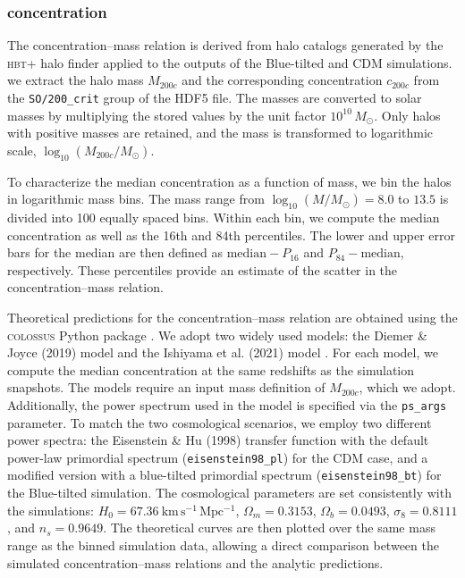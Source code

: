 \documentclass[
 reprint,
 superscriptaddress,
 nofootinbib,
 nobibnotes,
 amsmath,
 amssymb,
 aps,
 prd,
 floatfix,
 longbibliography
]{revtex4-1}
\begin{document}
\subsubsection{concentration\label{subsub:concentration}}
{\color{blue}The concentration–mass relation is derived from halo catalogs generated by the \textsc{hbt+} halo finder applied to the outputs of the Blue-tilted and CDM simulations. we extract the halo mass \(M_{200c}\) and the corresponding concentration \(c_{200c}\) from the \texttt{SO/200\_crit} group of the HDF5 file. The masses are converted to solar masses by multiplying the stored values by the unit factor \(10^{10}\,M_{\odot}\). Only halos with positive masses are retained, and the mass is transformed to logarithmic scale, \(\log_{10}(M_{200c}/M_{\odot})\).

To characterize the median concentration as a function of mass, we bin the halos in logarithmic mass bins. The mass range from \(\log_{10}(M/M_{\odot}) = 8.0\) to \(13.5\) is divided into 100 equally spaced bins. Within each bin, we compute the median concentration as well as the 16th and 84th percentiles. The lower and upper error bars for the median are then defined as \(\mathrm{median} - P_{16}\) and \(P_{84} - \mathrm{median}\), respectively. These percentiles provide an estimate of the scatter in the concentration–mass relation.

Theoretical predictions for the concentration–mass relation are obtained using the \textsc{colossus} Python package \citep{Diemer2018}. We adopt two widely used models: the Diemer \& Joyce (2019) model \citep{Diemer2019} and the Ishiyama et al. (2021) model \citep{Ishiyama2021}. For each model, we compute the median concentration at the same redshifts as the simulation snapshots. The models require an input mass definition of \(M_{200c}\), which we adopt. Additionally, the power spectrum used in the model is specified via the \texttt{ps\_args} parameter. To match the two cosmological scenarios, we employ two different power spectra: the Eisenstein \& Hu (1998) transfer function \citep{Eisenstein1998} with the default power-law primordial spectrum (\texttt{eisenstein98\_pl}) for the CDM case, and a modified version with a blue-tilted primordial spectrum (\texttt{eisenstein98\_bt}) for the Blue-tilted simulation. The cosmological parameters are set consistently with the simulations: \(H_0 = 67.36\ \mathrm{km\,s^{-1}\,Mpc^{-1}}\), \(\Omega_m = 0.3153\), \(\Omega_b = 0.0493\), \(\sigma_8 = 0.8111\), and \(n_s = 0.9649\). The theoretical curves are then plotted over the same mass range as the binned simulation data, allowing a direct comparison between the simulated concentration–mass relations and the analytic predictions.

}
\end{document}
